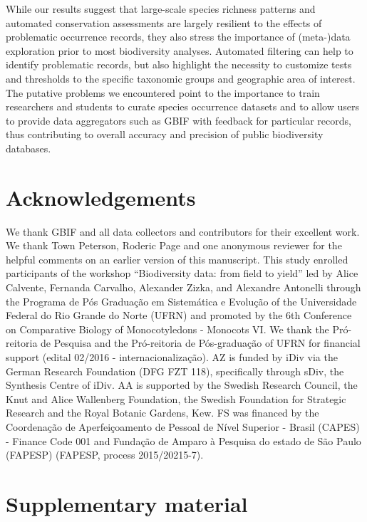 \documentclass[fleqn,10pt,lineno]{wlpeerj} %
\begin{document}
While our results suggest that large-scale species richness patterns and automated conservation assessments are largely resilient to the effects of problematic occurrence records, they also stress the importance of (meta-)data exploration prior to most biodiversity analyses. Automated filtering can help to identify problematic records, but also highlight the necessity to customize tests and thresholds to the specific taxonomic groups and geographic area of interest. The putative problems we encountered point to the importance to train researchers and students to curate species occurrence datasets and to allow users to provide data aggregators such as GBIF with feedback for particular records, thus contributing to overall accuracy and precision of public biodiversity databases.

\hypertarget{acknowledgements}{%
\section*{Acknowledgements}\label{acknowledgements}}

We thank GBIF and all data collectors and contributors for their excellent work. We thank Town Peterson, Roderic Page and one anonymous reviewer for the helpful comments on an earlier version of this manuscript. This study enrolled participants of the workshop ``Biodiversity data: from field to yield'' led by Alice Calvente, Fernanda Carvalho, Alexander Zizka, and Alexandre Antonelli through the Programa de Pós Graduação em Sistemática e Evolução of the Universidade Federal do Rio Grande do Norte (UFRN) and promoted by the 6th Conference on Comparative Biology of Monocotyledons - Monocots VI. We thank the Pró-reitoria de Pesquisa and the Pró-reitoria de Pós-graduação of UFRN for financial support (edital 02/2016 - internacionalização). AZ is funded by iDiv via the German Research Foundation (DFG FZT 118), specifically through sDiv, the Synthesis Centre of iDiv. AA is supported by the Swedish Research Council, the Knut and Alice Wallenberg Foundation, the Swedish Foundation for Strategic Research and the Royal Botanic Gardens, Kew. FS was financed by the Coordenação de Aperfeiçoamento de Pessoal de Nível Superior - Brasil (CAPES) - Finance Code 001 and Fundação de Amparo à Pesquisa do estado de São Paulo (FAPESP) (FAPESP, process 2015/20215-7).

\hypertarget{supplementary-material}{%
\section*{Supplementary material}\label{supplementary-material}}
\end{document}
